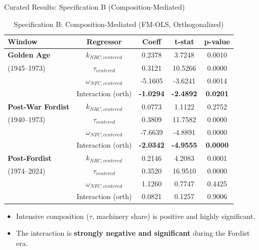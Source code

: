 \documentclass[10pt]{beamer}
\begin{document}
\begin{frame}{Curated Results: Specification B (Composition-Mediated)}
  \begin{table}[htbp]
    \centering
    \caption{Specification B: Composition-Mediated (FM-OLS, Orthogonalized)}
    \begin{tabular}{lcccc}
      \toprule
      \textbf{Window} & \textbf{Regressor} & \textbf{Coeff} & \textbf{t-stat} & \textbf{p-value} \\
      \midrule
      \textbf{Golden Age} & $k_{NRC, centered}$ & 0.2378 & 3.7248 & 0.0010 \\
      (1945--1973) & $\tau_{centered}$ & 0.3121 & 10.5266 & 0.0000 \\
      & $\omega_{NFC, centered}$ & -5.1605 & -3.6241 & 0.0014 \\
      & Interaction (orth) & \textbf{-1.0294} & \textbf{-2.4892} & \textbf{0.0201} \\
      \midrule
      \textbf{Post-War Fordist} & $k_{NRC, centered}$ & 0.0773 & 1.1122 & 0.2752 \\
      (1940--1973) & $\tau_{centered}$ & 0.3809 & 11.7582 & 0.0000 \\
      & $\omega_{NFC, centered}$ & -7.6639 & -4.8891 & 0.0000 \\
      & Interaction (orth) & \textbf{-2.0342} & \textbf{-4.9555} & \textbf{0.0000} \\
      \midrule
      \textbf{Post-Fordist} & $k_{NRC, centered}$ & 0.2146 & 4.2083 & 0.0001 \\
      (1974--2024) & $\tau_{centered}$ & 0.3520 & 16.9510 & 0.0000 \\
      & $\omega_{NFC, centered}$ & 1.1260 & 0.7747 & 0.4425 \\
      & Interaction (orth) & 0.0821 & 0.1257 & 0.9006 \\
      \bottomrule
    \end{tabular}
  \end{table}
  \begin{itemize}
    \item Intensive composition ($\tau$, machinery share) is positive and highly significant.
    \item The interaction is \textbf{strongly negative and significant} during the Fordist era.
  \end{itemize}
\end{frame}
\end{document}
